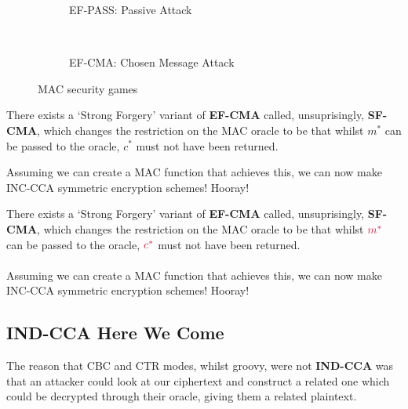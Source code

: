     \begin{figure}[htp!]
    \centering
    \begin{subfigure}[b]{0.4\textwidth}
        \centering
        \begin{cryptogame}{}
            \cgameleft{$\cmast$, $\ccast$}
        \end{cryptogame}
        \caption{EF-PASS: Passive Attack}
        \label{fig:ef-pass}
    \end{subfigure}
    ~
    \begin{subfigure}[b]{0.4\textwidth}
        \centering
        \begin{cryptogame}{}
            \cgameleft{$\cmast$, $\ccast$}
        \end{cryptogame}
        \caption{EF-CMA: Chosen Message Attack}
        \label{fig:ef-cma}
    \end{subfigure}
    \caption{MAC security games}
    \label{fig:ef-games}
\end{figure}

    There exists a `Strong Forgery' variant of \textbf{EF-CMA} called, unsuprisingly, \textbf{SF-CMA}, which changes the restriction on the MAC oracle to be that whilst $m^{*}$ can be passed to the oracle, $c^{*}$ must not have been returned.

    Assuming we can create a MAC function that achieves this, we can now make INC-CCA symmetric encryption schemes! Hooray!

    There exists a `Strong Forgery' variant of \textbf{EF-CMA} called, unsuprisingly, \textbf{SF-CMA}, which changes the restriction on the MAC oracle to be that whilst $\cmast$ can be passed to the oracle, $\ccast$ must not have been returned.\\
    \\
    Assuming we can create a MAC function that achieves this, we can now make INC-CCA symmetric encryption schemes! Hooray!

    \subsection{IND-CCA Here We Come}
    The reason that CBC and CTR modes, whilst groovy, were not \textbf{IND-CCA} was that an attacker could look at our ciphertext and construct a related one which could be decrypted through their oracle, giving them a related plaintext.

